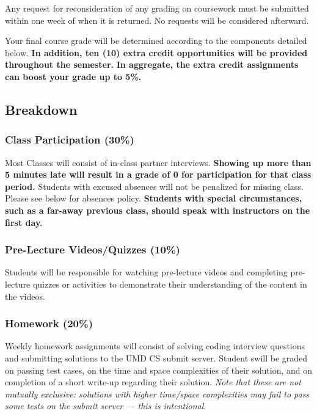 \documentclass[12pt]{article}
\begin{document}
Any request for reconsideration of any grading on coursework must be submitted within one week of when it is returned.
No requests will be considered afterward.

Your final course grade will be determined according to the components detailed below.
\textbf{In addition, ten (10) extra credit opportunities will be provided throughout the semester.}
\textbf{In aggregate, the extra credit assignments can boost your grade up to 5\%.} \medskip

\subsection*{Breakdown}
\subsubsection*{Class Participation (30\%)}

\noindent Most Classes will consist of in-class partner interviews.
\textbf{Showing up more than 5 minutes late will result in a grade of 0 for participation for that class period.}
Students with excused absences will not be penalized for missing class.
Please see below for absences policy.
\textbf{​Students with special circumstances, such as a far-away previous class, should speak with instructors on the first day.}

\subsubsection*{Pre-Lecture Videos/Quizzes (10\%)}
Students will be responsible for watching pre-lecture videos and
completing pre-lecture quizzes or activities to demonstrate their understanding of the content in the videos.

\subsubsection*{Homework (20\%)}
Weekly homework assignments will consist of solving coding interview questions and submitting solutions to the UMD CS submit server.
Student swill be graded on passing test cases, on the time and space complexities of their solution, and on completion of a short write-up regarding their solution.
{\em Note that these are not mutually exclusive: solutions with higher time/space complexities may fail to pass some tests on the submit server --- this is intentional.}
\end{document}
